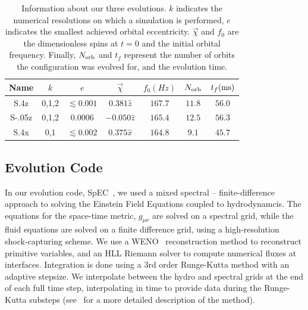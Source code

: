 \documentclass[aps,prd,amsmath,floatfix
,twocolumn
,superscriptaddress,nofootinbib,showpacs]{revtex4-1}
\theoremstyle{plain} \newtheorem{thm}{Theorem} \newtheorem{lem}{Lemma}
\newcommand{\red}[1]{\textcolor{Red}{#1}}
\begin{document}
\begin{table}
\begin{tabular} {c | c | c | c | c | c | c}
Name & $k$ & $e$ & $\vec{\chi}$ & $f_{0}(Hz)$ & $N_{\rm orb}$ & $t_{f}({\rm ms})$ \\ \hline
S.4z & 0,1,2 & $\lesssim 0.001$ & $0.381\hat{z}$ & $167.7$ & $11.8$ & $56.0$ \\ \hline
S-.05z & 0,1,2 & $0.0006$ & $-0.050\hat{z}$ & $165.4$ & $12.5$ & $56.3$ \\ \hline
S.4x & 0,1 & $\lesssim 0.002$ & $0.375\hat{x}$ & $164.8$ & $9.1$ & $45.7$ \\ \hline
\end{tabular}
\caption{ {\label{tab:RunInfo}} Information about our three evolutions.  $k$ indicates the numerical resolutions on which a simulation is performed, $e$ indicates the smallest achieved orbital eccentricity.  $\vec\chi$ and $f_0$ are the dimensionless spins at $t=0$ and the initial orbital frequency.  Finally, $N_{\rm orb}$ and $t_f$ represent the number of orbits the configuration was evolved for, and the evolution time.}
\end{table}


\subsection{Evolution Code}
\label{sec:EvolutionCode}

In our evolution code, SpEC~\cite{Buchman:2012dw,Lovelace:2011nu,
Scheel2009,Kidder2000a,Lindblom2006,Scheel2006,Szilagyi:2009qz,Lovelace:2010ne,
Hemberger:2012jz,Ossokine:2013zga}, we used a mixed spectral --
finite-difference approach to solving the
Einstein Field Equations coupled to hydrodynamcis. The equations for the
space-time metric,
$g_{\mu\nu}$ are solved on a spectral grid, while the fluid equations
are solved on a finite difference grid, using a high-resolution
shock-capturing scheme. We use a WENO~\cite{Jiang1996202,Muhlberger2014}
reconstruction method to
reconstruct primitive variables, and an HLL\cite{HLL} Riemann solver to
compute
numerical fluxes at interfaces. Integration is done using a 3rd order
Runge-Kutta method with an adaptive stepsize. We interpolate between
the hydro and spectral grids at the end of each full time step, interpolating
in time to provide data during the Runge-Kutta substeps
(see~\cite{Duez:2008rb,FoucartEtAl:2011,Foucart:2013a} for a more detailed
description of the method).
\end{document}
